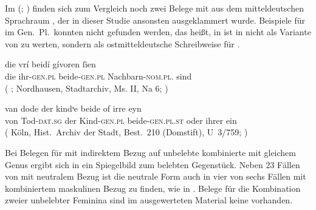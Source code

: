 Im  (\REM; \nosh\cite{rem}) finden sich
zum Vergleich noch zwei Belege mit  aus dem
mitteldeutschen Sprachraum
, der in dieser Studie ansonsten ausgeklammert wurde.
Beispiele für  im Gen.\ Pl.\ konnten nicht gefunden werden, das
heißt,  in  ist in  nicht als Variante
von  zu werten, sondern als ostmitteldeutsche
Schreibweise für  \autocites[52--53]{paul2007}[305]{ksw2}.

\begin{exe}
\ex \label{ex:remgenbeide}
\begin{xlist}
	\ex \label{ex:remgenbeide_1}
		\gll %
			die vrí beidí gívoren ſien \\
			die ihr-\textsc{gen.pl} beide-\textsc{gen.pl}
				Nachbarn-\textsc{nom.pl.\MascA}\footnotemark{} sind \\
		\trans {} (%
				;
				Nordhausen, Stadtarchiv, Ms. II, Na 6;
				\cite[M320: 17v,21--22]{rem}%
			)

	\ex \label{ex:remgenbeide_2}
		\gll van dode der kindˢe beide of irre eyn \\
			von Tod-\textsc{dat.sg} der Kind-\textsc{gen.pl}
				beide-\textsc{gen.pl.st} oder ihrer ein \\
		\trans {}
			(%
				Köln, Hist.~Archiv der Stadt, Best.~210
				\mkbibparens{Domstift}, U~3/759;
				\cite[M350: 5,11]{rem}%
			)
\end{xlist}
\end{exe}


Bei Belegen für  mit indirektem Bezug auf unbelebte kombinierte
 mit gleichem Genus ergibt sich in
 ein Spiegelbild zum belebten Gegenstück. Neben 23
Fällen von  mit neutralem Bezug ist die neutrale Form auch in vier
von sechs Fällen mit kombiniertem maskulinen Bezug zu finden, wie in
. Belege für die Kombination zweier
unbelebter Feminina sind im ausgewerteten Material keine vorhanden.

